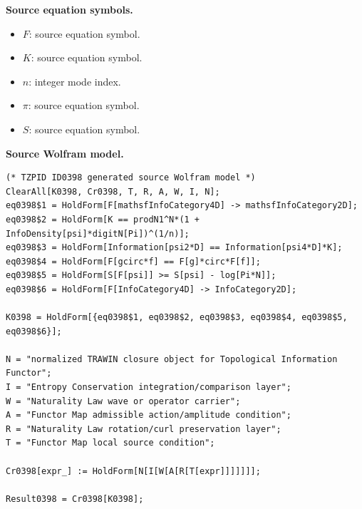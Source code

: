 \begin{minipage}[t]{0.49\linewidth}
\begingroup
\small
\raggedright
\textbf{Source equation symbols.}\par
\begin{itemize}[leftmargin=1.35em,itemsep=1pt,topsep=1pt,parsep=0pt]
    \item $F$: source equation symbol.
    \item $K$: source equation symbol.
    \item $n$: integer mode index.
    \item $\pi$: source equation symbol.
    \item $S$: source equation symbol.
\end{itemize}
\endgroup
\end{minipage}\hfill
\begin{minipage}[t]{0.47\linewidth}
\begingroup
\scriptsize
\raggedright
\textbf{Source Wolfram model.}\par
\begin{Verbatim}[fontsize=\tiny,breaklines=true,breakanywhere=true]
(* TZPID ID0398 generated source Wolfram model *)
ClearAll[K0398, Cr0398, T, R, A, W, I, N];
eq0398$1 = HoldForm[F[mathsfInfoCategory4D] -> mathsfInfoCategory2D];
eq0398$2 = HoldForm[K == prodN1^N*(1 + InfoDensity[psi]*digitN[Pi])^(1/n)];
eq0398$3 = HoldForm[Information[psi2*D] == Information[psi4*D]*K];
eq0398$4 = HoldForm[F[gcirc*f] == F[g]*circ*F[f]];
eq0398$5 = HoldForm[S[F[psi]] >= S[psi] - log[Pi*N]];
eq0398$6 = HoldForm[F[InfoCategory4D] -> InfoCategory2D];

K0398 = HoldForm[{eq0398$1, eq0398$2, eq0398$3, eq0398$4, eq0398$5, eq0398$6}];

N = "normalized TRAWIN closure object for Topological Information Functor";
I = "Entropy Conservation integration/comparison layer";
W = "Naturality Law wave or operator carrier";
A = "Functor Map admissible action/amplitude condition";
R = "Naturality Law rotation/curl preservation layer";
T = "Functor Map local source condition";

Cr0398[expr_] := HoldForm[N[I[W[A[R[T[expr]]]]]]];

Result0398 = Cr0398[K0398];
\end{Verbatim}
\endgroup
\end{minipage}

